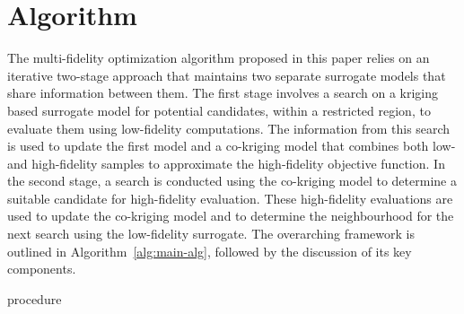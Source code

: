 \section{\AlgName{} Algorithm}\label{sec:method}
The multi-fidelity optimization algorithm proposed in this paper relies on an iterative two-stage approach that maintains two separate surrogate models that share information between them. The first stage involves a search on a kriging based surrogate model for potential candidates, within a restricted region, to evaluate them using low-fidelity computations. The information from this search is used to update the first model and a co-kriging model that combines both low- and high-fidelity samples to approximate the high-fidelity objective function. In the second stage, a search is conducted using the co-kriging model to determine a suitable candidate for high-fidelity evaluation. These high-fidelity evaluations are used to update the co-kriging model and to determine the neighbourhood for the next search using the low-fidelity surrogate. The overarching framework is outlined in Algorithm~\ref{alg:main-alg}, followed by the discussion of its key components.  

\begin{algorithm}[h!]
\caption{\AlgName{} procedure}
\label{alg:main-alg}
{\footnotesize 
\begin{algorithmic}[1]
 
 
  
   
   
   
   
   
   
   
   
     
  \ENDIF
\ENDWHILE
\end{algorithmic}
}
\end{algorithm}

